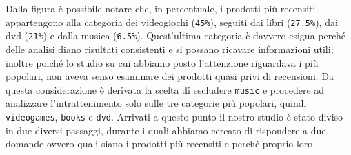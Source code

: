 		Dalla figura è possibile notare che, in percentuale, i prodotti più recensiti appartengono alla categoria dei videogiochi (\verb|45%|), seguiti dai libri (\verb|27.5%|), dai dvd (\verb|21%|) e dalla musica (\verb|6.5%|). Quest'ultima categoria è davvero esigua perché delle analisi diano risultati consistenti e si possano ricavare informazioni utili; inoltre poiché lo studio su cui abbiamo posto l'attenzione riguardava i più popolari, non aveva senso esaminare dei prodotti quasi privi di recensioni. Da questa considerazione è derivata la scelta di escludere \verb|music| e procedere ad analizzare l'intrattenimento solo sulle tre categorie più popolari, quindi \verb|videogames|, \verb|books| e \verb|dvd|. Arrivati a questo punto il nostro studio è stato diviso in due diversi passaggi, durante i quali abbiamo cercato di rispondere a due domande ovvero quali siano i prodotti più recensiti e perché proprio loro. 
			
